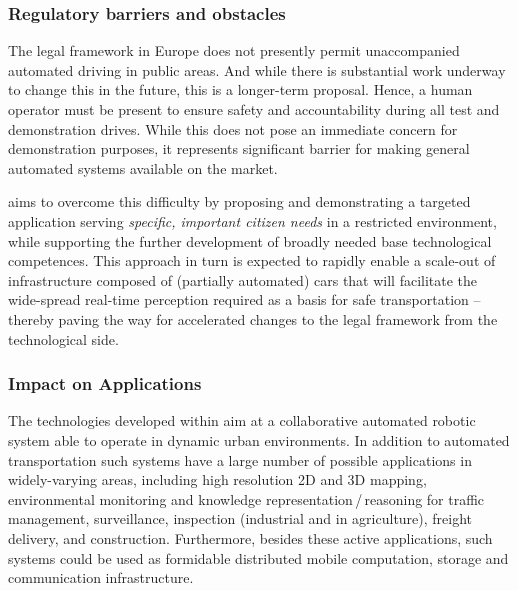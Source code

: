
\subsubsection{Regulatory barriers and obstacles}
The legal framework in Europe does not presently permit unaccompanied automated driving in public areas. And while there is substantial work underway to change this in the future, this is a longer-term proposal. Hence, a human operator must be present to ensure safety and accountability during all \Project{} test and demonstration drives. While this does not pose an immediate concern for demonstration purposes, it represents significant barrier for making general automated systems available on the market. 

\Project{} aims to overcome this difficulty by proposing and demonstrating a targeted application serving \emph{specific, important citizen needs} in a restricted environment, while supporting the further development of broadly needed base technological competences. This approach in turn is expected to rapidly enable a scale-out of infrastructure composed of (partially automated) cars that will facilitate the wide-spread real-time perception required as a basis for safe transportation -- thereby paving the way for accelerated changes to the legal framework from the technological side.


\subsubsection{Impact on Applications}
\label{sec:apps}
The technologies developed within \Project{} aim at a collaborative automated robotic system able to operate in dynamic urban environments. In addition to automated transportation such systems have a large number of possible applications in widely-varying areas, including high resolution 2D and 3D mapping, environmental monitoring and knowledge representation\,/\,reasoning for traffic management, surveillance, inspection (industrial and in agriculture), freight delivery, and construction. Furthermore, besides these active applications, such systems could be used as formidable distributed mobile computation, storage and communication infrastructure.

